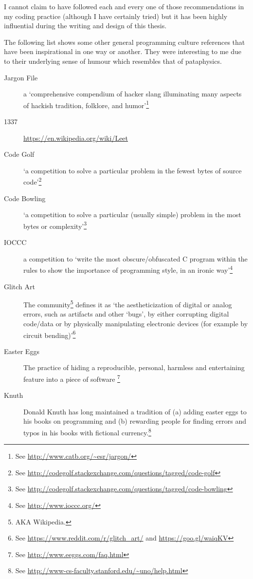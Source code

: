 I cannot claim to have followed each and every one of those recommendations in my coding practice (although I have certainly tried) but it has been highly influential during the writing and design of this thesis.

\spirals

The following list shows some other general programming culture references that have been inspirational in one way or another. They were interesting to me due to their underlying sense of humour which resembles that of pataphysics.

\begin{description}
  \item [Jargon File] a `comprehensive compendium of hacker slang illuminating many aspects of hackish tradition, folklore, and humor'\footnote{See \url{http://www.catb.org/~esr/jargon/}}
  \item [1337] \url{https://en.wikipedia.org/wiki/Leet}
  \item [Code Golf] `a competition to solve a particular problem in the fewest bytes of source code'\footnote{See \url{http://codegolf.stackexchange.com/questions/tagged/code-golf}}
  \item [Code Bowling] `a competition to solve a particular (usually simple) problem in the most bytes or complexity'\footnote{See \url{http://codegolf.stackexchange.com/questions/tagged/code-bowling}}
  \item [\ac{IOCCC}] a competition to `write the most obscure/obfuscated C program within the rules to show the importance of programming style, in an ironic way'\footnote{See \url{http://www.ioccc.org/}}
  \item [Glitch Art] The community\footnote{AKA Wikipedia.} defines it as `the aestheticization of digital or analog errors, such as artifacts and other `bugs', by either corrupting digital code/data or by physically manipulating electronic devices (for example by circuit bending)'\footnote{See \url{https://www.reddit.com/r/glitch_art/} and \url{https://goo.gl/waiqKV}}
  \item [Easter Eggs] The practice of hiding a reproducible, personal, harmless and entertaining feature into a piece of software \footnote{See \url{http://www.eeggs.com/faq.html}}
  \item [Knuth] Donald Knuth has long maintained a tradition of (a) adding easter eggs to his books on programming and (b) rewarding people for finding errors and typos in his books with fictional currency.\footnote{See \url{http://www-cs-faculty.stanford.edu/~uno/help.html}}
\end{description}


